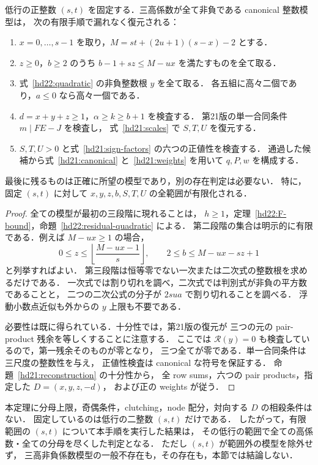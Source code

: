 \begin{theorem}
\label{hd22:fixed-row-finite}
低行の正整数 $(s,t)$ を固定する．三高係数が全て非負である canonical 整数模型は，
次の有限手順で漏れなく復元される：
\begin{enumerate}
 \item $x=0,\ldots,s-1$ を取り，$M=st+(2u+1)(s-x)-2$ とする．
 \item $z\ge0$，$b\ge2$ のうち $b-1+sz\le M-ux$ を満たすものを全て取る．
 \item 式~\eqref{hd22:quadratic} の非負整数根 $y$ を全て取る．
 各五組に高々二個であり，$a\le0$ なら高々一個である．
 \item $d=x+y+z\ge1$，$\alpha\ge k\ge b+1$ を検査する．
 第21版の単一合同条件 $m\mid FE-J$ を検査し，
 式~\eqref{hd21:scales} で $S,T,U$ を復元する．
 \item $S,T,U>0$ と式~\eqref{hd21:sign-factors} の六つの正値性を検査する．
 通過した候補から式~\eqref{hd21:canonical} と~\eqref{hd21:weights} を用いて
 $q,P,w$ を構成する．
\end{enumerate}
最後に残るものは正確に所望の模型であり，別の存在判定は必要ない．
特に，固定 $(s,t)$ に対して $x,y,z,b,S,T,U$ の全範囲が有限化される．
\end{theorem}

\begin{proof}
全ての模型が最初の三段階に現れることは，
$h\ge1$，定理~\ref{hd22:F-bound}，命題~\ref{hd22:residual-quadratic} による．
第二段階の集合は明示的に有限である．例えば $M-ux\ge1$ の場合，
\[
 0\le z\le\left\lfloor\frac{M-ux-1}{s}\right\rfloor,
 \qquad 2\le b\le M-ux-sz+1
\]
と列挙すればよい．
第三段階は恒等零でない一次または二次式の整数根を求めるだけである．
一次式では割り切れを調べ，二次式では判別式が非負の平方数であることと，
二つの二次公式の分子が $2sua$ で割り切れることを調べる．
浮動小数点近似も外からの $y$ 上限も不要である．

必要性は既に得られている．十分性では，第21版の復元が
三つの元の pair-product 残余を等しくすることに注意する．
ここでは $\mathcal R(y)=0$ も検査しているので，第一残余そのものが零となり，
三つ全てが零である．単一合同条件は三尺度の整数性を与え，
正値性検査は canonical な符号を保証する．
命題~\ref{hd21:reconstruction} の十分性から，
全 row sums，六つの pair products，指定した $D=(x,y,z,-d)$，
および正の weights が従う．
\end{proof}

\begin{remark}[有限化の範囲と計算の意味]
\label{hd22:scope}
本定理に分母上限，奇偶条件，clutching，node 配分，対向する $D$ の相殺条件はない．
固定しているのは低行の二整数 $(s,t)$ だけである．
したがって，有限範囲の $(s,t)$ について本手順を実行した結果は，
その低行の範囲で全ての高係数・全ての分母を尽くした判定となる．
ただし $(s,t)$ が範囲外の模型を除外せず，
三高非負係数模型の一般不存在も，その存在も，本節では結論しない．
\end{remark}


